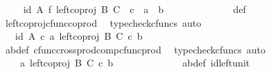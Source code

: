 \begin{isabellebody}
\ \isamarkupfalse%
\ {\isachardoublequoteopen}{\isachardot}{\kern0pt}{\isachardot}{\kern0pt}{\isachardot}{\kern0pt}\ {\isacharequal}{\kern0pt}\ {\isacharparenleft}{\kern0pt}id\ A\ {\isasymtimes}\isactrlsub f\ left{\isacharunderscore}{\kern0pt}coproj\ B\ C{\isacharparenright}{\kern0pt}\ \ {\isasymcirc}\isactrlsub c\ {\isasymlangle}\ a{\isacharprime}{\kern0pt}{\isacharcomma}{\kern0pt}\ \ b{\isacharprime}{\kern0pt}{\isasymrangle}{\isachardoublequoteclose}\isanewline
\ \ \ \ \ \ \ \ \ \ \ \ \isamarkupfalse%
\ {\isasymphi}{\isacharunderscore}{\kern0pt}def\ \isamarkupfalse%
\ left{\isacharunderscore}{\kern0pt}coproj{\isacharunderscore}{\kern0pt}cfunc{\isacharunderscore}{\kern0pt}coprod\ \isamarkupfalse%
\ {\isacharparenleft}{\kern0pt}typecheck{\isacharunderscore}{\kern0pt}cfuncs{\isacharcomma}{\kern0pt}\ auto{\isacharparenright}{\kern0pt}\isanewline
\ \ \ \ \ \ \ \ \ \ \isamarkupfalse%
\ \isamarkupfalse%
\ {\isachardoublequoteopen}{\isachardot}{\kern0pt}{\isachardot}{\kern0pt}{\isachardot}{\kern0pt}\ {\isacharequal}{\kern0pt}\ {\isasymlangle}id\ A\ {\isasymcirc}\isactrlsub c\ a{\isacharprime}{\kern0pt}{\isacharcomma}{\kern0pt}\ left{\isacharunderscore}{\kern0pt}coproj\ B\ C\ {\isasymcirc}\isactrlsub c\ b{\isacharprime}{\kern0pt}{\isasymrangle}{\isachardoublequoteclose}\isanewline
\ \ \ \ \ \ \ \ \ \ \ \ \isamarkupfalse%
\ a{\isacharprime}{\kern0pt}b{\isacharprime}{\kern0pt}{\isacharunderscore}{\kern0pt}def\ cfunc{\isacharunderscore}{\kern0pt}cross{\isacharunderscore}{\kern0pt}prod{\isacharunderscore}{\kern0pt}comp{\isacharunderscore}{\kern0pt}cfunc{\isacharunderscore}{\kern0pt}prod\ \isamarkupfalse%
\ {\isacharparenleft}{\kern0pt}typecheck{\isacharunderscore}{\kern0pt}cfuncs{\isacharcomma}{\kern0pt}\ auto{\isacharparenright}{\kern0pt}\isanewline
\ \ \ \ \ \ \ \ \ \ \isamarkupfalse%
\ \isamarkupfalse%
\ {\isachardoublequoteopen}{\isachardot}{\kern0pt}{\isachardot}{\kern0pt}{\isachardot}{\kern0pt}\ {\isacharequal}{\kern0pt}\ \ {\isasymlangle}a{\isacharprime}{\kern0pt}{\isacharcomma}{\kern0pt}\ left{\isacharunderscore}{\kern0pt}coproj\ B\ C\ {\isasymcirc}\isactrlsub c\ b{\isacharprime}{\kern0pt}{\isasymrangle}{\isachardoublequoteclose}\isanewline
\ \ \ \ \ \ \ \ \ \ \ \ \isamarkupfalse%
\ a{\isacharprime}{\kern0pt}b{\isacharprime}{\kern0pt}{\isacharunderscore}{\kern0pt}def\ id{\isacharunderscore}{\kern0pt}left{\isacharunderscore}{\kern0pt}unit{}\ \isamarkupfalse%

\end{isabellebody}
